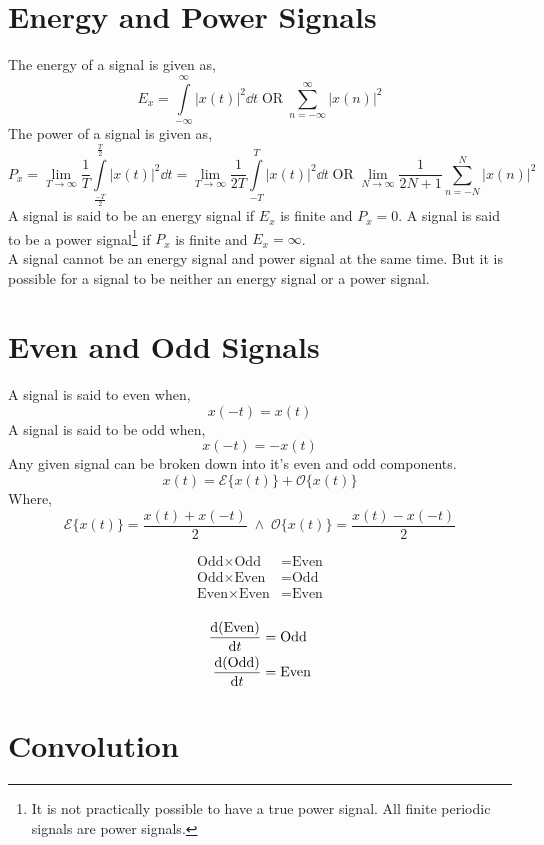 		\section{Energy and Power Signals}
		The energy of a signal is given as,
		\[E_x=\int\limits_{-\infty}^\infty|x(t)|^2\dd{t} \; \text{OR} \; \sum\limits_{n=-\infty}^\infty |x(n)|^2\]
		The power of a signal is given as,
		\[P_x=\lim\limits_{T\to\infty}\frac{1}{T}\int\limits_{\frac{-T}{2}}^\frac{T}{2}|x(t)|^2\dd{t}=\lim\limits_{T\to\infty}\frac{1}{2T}\int\limits_{-T}^T|x(t)|^2\dd{t} \; \text{OR} \; \lim\limits_{N\to\infty}\frac{1}{2N+1}\sum\limits_{n=-N}^N |x(n)|^2\]
		A signal is said to be an energy signal if $E_x$ is finite and $P_x=0$. A signal is said to be a power signal\footnote{It is not practically possible to have a true power signal. All finite periodic signals are power signals.} if $P_x$ is finite and $E_x=\infty$.\\
		A signal cannot be an energy signal and power signal at the same time. But it is possible for a signal to be neither an energy signal or a power signal.
		\section{Even and Odd Signals}
		A signal is said to even when,
		\[x(-t)=x(t)\]
		A signal is said to be odd when,
		\[x(-t)=-x(t)\]
		Any given signal can be broken down into it's even and odd components.
		\[x(t)=\mathcal{E}\{x(t)\}+\mathcal{O}\{x(t)\}\]
		Where,
		\[\mathcal{E}\{x(t)\}=\frac{x(t)+x(-t)}{2} \; \land \; \mathcal{O}\{x(t)\}=\frac{x(t)-x(-t)}{2}\]
		\begin{theorem}[Multiplications]
			\[\begin{split}
				\text{Odd}\times\text{Odd} &=\text{Even}\\
				\text{Odd}\times\text{Even} &=\text{Odd}\\
				\text{Even}\times\text{Even} &=\text{Even}\\
			\end{split}\]			
		\end{theorem}
		\begin{theorem}[Derivatives]
			\[\begin{split}
				\dv{(\text{Even})}{t}&=\text{Odd}\\
				\dv{(\text{Odd})}{t}&=\text{Even}
			\end{split}\]
		\end{theorem}
		\section{Convolution}
